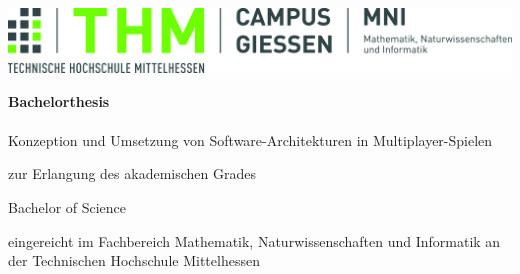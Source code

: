
\begin{titlepage}

\begin{center}
\includegraphics[width=1\textwidth]{images/Logo_THM_MNI.jpg}
\par\end{center}


\noindent \begin{center}
\vspace{1cm}

\par\end{center}

\noindent \begin{center}
\textsf{\textbf{\huge Bachelorthesis}}\textsf{}\\
\textsf{}\\
\textsf{\Large Konzeption und Umsetzung von Software-Architekturen in Multiplayer-Spielen}
\par\end{center}{\Large \par}

\vspace{1cm}


\begin{center}
zur Erlangung des akademischen Grades
\par\end{center}

\begin{center}
{\textsf{\large Bachelor of Science}}
\par\end{center}{\large \par}

\begin{center}
eingereicht im Fachbereich Mathematik, Naturwissenschaften und Informatik an der Technischen Hochschule Mittelhessen{\large \vspace{1cm}
}
\par\end{center}{\large \par}


\end{titlepage}
